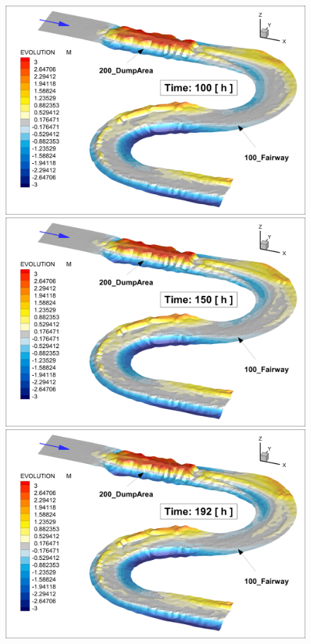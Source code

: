 \begin{figure} [!h]
\includegraphics[scale=0.14]{../img/critDig_Poly_100h.png}
\includegraphics[scale=0.14]{../img/critDig_Poly_150h.png}
\includegraphics[scale=0.14]{../img/critDig_Poly_192h.png}

\end{figure}
